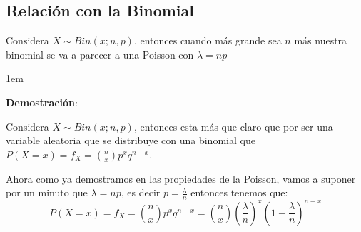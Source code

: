 \documentclass[12pt, fleqn]{report}                             %
\newenvironment{SmallIndentation}[1][0.75em]                    %
        {\begin{adjustwidth}{#1}{}\begin{footnotesize}}             %
        {\end{footnotesize}\end{adjustwidth}}                       %
\theoremstyle{break}                                            %
\newcommand{\Wrap}[1]           {\left( #1 \right)}             %
\begin{document}
            \clearpage
            \subsection{Relación con la Binomial}

                Considera $X \sim Bin(x; n, p)$, entonces cuando más grande sea $n$ más nuestra binomial se 
                va a parecer a una Poisson con $\lambda = np$

                \begin{SmallIndentation}[1em]
                    \textbf{Demostración}:
                    
                    Considera $X \sim Bin(x; n, p)$, entonces esta más que claro que por
                    ser una variable aleatoria que se distribuye con una binomial
                    que $P(X = x) = f_X = {n \choose x}p^x q^{n - x}$.

                    Ahora como ya demostramos en las propiedades de la Poisson, vamos a suponer
                    por un minuto que $\lambda = np$, es decir $p = \frac{\lambda}{n}$ entonces tenemos que:
                    \begin{equation*}
                        P(X = x) 
                            = f_X 
                            = {n \choose x}p^x q^{n - x}
                            = {n \choose x}\Wrap{\frac{\lambda}{n}}^x \Wrap{1 - \frac{\lambda}{n}}^{n - x}
                    \end{equation*}


\end{SmallIndentation}
\end{document}
